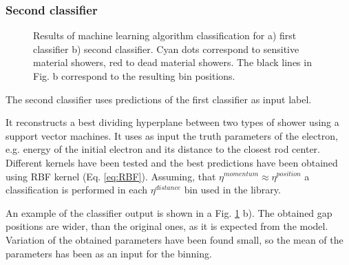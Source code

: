 \begin{figure}[!tbp]
\end{figure}

\subsubsection{Second classifier}

\begin{figure}[!tbp]
\begin{minipage}[h]{0.49\linewidth}
\end{minipage}
\hfill
\begin{minipage}[h]{0.49\linewidth}
\end{minipage}
\caption{Results of machine learning algorithm classification for a) first classifier b) second classifier. Cyan dots correspond to sensitive material showers, red to dead material showers. The black lines in Fig. b correspond to the resulting bin positions.}
\label{fig:Class}
\end{figure}

The second classifier uses predictions of the first classifier as input label. 

It reconstructs a best dividing hyperplane between two types of shower using a support vector machines. It uses as input the truth parameters of the electron, e.g. energy of the initial electron and its distance to the closest rod center. Different kernels have been tested and the best predictions have been obtained using RBF kernel (Eq. \ref{eq:RBF}).  Assuming, that $\eta^{momentum} \approx \eta^{position}$ a classification is performed in each $\eta^{distance}$ bin used in the library. 

An example of the classifier output is shown in a Fig. \ref{fig:Class} b). The obtained gap positions are wider, than the original ones, as it is expected from the model.  Variation of the obtained parameters have been found small, so the mean of the parameters has been as an input for the binning.  

